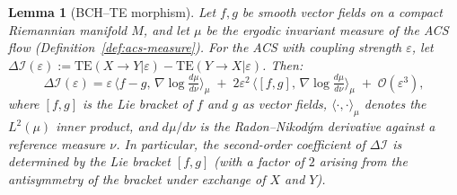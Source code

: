 \documentclass[12pt,a4paper]{article}
\theoremstyle{plain}
\newtheorem{lemma}[theorem]{Lemma}
\theoremstyle{definition}
\theoremstyle{remark}
\newcommand{\DI}{\Delta\mathcal{I}}
\newcommand{\TE}{\mathrm{TE}}
\begin{document}
\begin{lemma}[BCH--TE morphism]\label{lem:bch-te}
Let $f, g$ be smooth vector fields on a compact Riemannian manifold $M$,
and let $\mu$ be the ergodic invariant measure of the ACS flow (Definition~\ref{def:acs-measure}).
For the ACS with coupling strength $\varepsilon$, let
$\DI(\varepsilon) := \TE(X{\to}Y|\varepsilon) - \TE(Y{\to}X|\varepsilon)$.
Then:
\[
  \DI(\varepsilon) = \varepsilon\,\langle f - g,\, \nabla\log\tfrac{d\mu}{d\nu}\rangle_\mu
  \;+\; 2\varepsilon^2\,\langle [f,g],\, \nabla\log\tfrac{d\mu}{d\nu}\rangle_\mu
  \;+\; \mathcal{O}(\varepsilon^3),
\]
where $[f,g]$ is the Lie bracket of $f$ and $g$ as vector fields,
$\langle\cdot,\cdot\rangle_\mu$ denotes the $L^2(\mu)$ inner product,
and $d\mu/d\nu$ is the Radon--Nikod\'ym derivative against a reference measure $\nu$.
In particular, the \emph{second-order coefficient of $\DI$ is determined by the Lie bracket $[f,g]$}
(with a factor of $2$ arising from the antisymmetry of the bracket under exchange of $X$ and $Y$).
\end{lemma}
\end{document}
